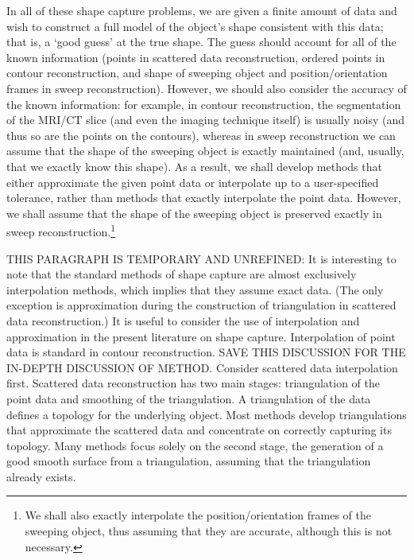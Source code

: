 In all of these shape capture problems,
we are given a finite amount of data and wish to 
construct a full model of the object's shape consistent with this data;
that is, a `good guess' at the true shape.
The guess should account for all of the known information (points in scattered
data reconstruction, ordered points in contour reconstruction, and
shape of sweeping object and position/orientation frames in sweep
reconstruction).
However, we should also consider the accuracy of the known information:
for example, in contour reconstruction, the segmentation of the MRI/CT 
slice (and even the imaging technique itself)
is usually noisy (and thus so are the points on the contours),
whereas in sweep reconstruction we can assume 
that the shape of the sweeping object is exactly maintained
(and, usually, that we exactly know this shape).
As a result, we shall develop methods that either approximate
the given point data or interpolate up to a user-specified tolerance,
rather than methods that exactly interpolate the point data.
However, we shall assume that the shape of the sweeping object
is preserved exactly in sweep reconstruction.\footnote{We shall also 
	exactly interpolate the position/orientation frames of the sweeping
	object, thus assuming that they are accurate, although this is not 
	necessary.}

THIS PARAGRAPH IS TEMPORARY AND UNREFINED:
It is interesting to note that the standard methods of shape capture
are almost exclusively interpolation methods, which implies that they assume
exact data.
(The only exception is approximation during the construction of triangulation
in scattered data reconstruction.)
It is useful to consider the use of interpolation and approximation
in the present literature on shape capture.
Interpolation of point data is standard in contour reconstruction.
SAVE THIS DISCUSSION FOR THE IN-DEPTH DISCUSSION OF METHOD.
Consider scattered data interpolation first.
Scattered data reconstruction has two main stages:
triangulation of the point data and smoothing of the triangulation.
A triangulation of the data defines a topology for the underlying object.
Most methods develop triangulations that approximate the scattered data
and concentrate on correctly capturing its topology.
Many methods focus solely on the second stage,
the generation of a good smooth surface from a triangulation, 
assuming that the triangulation already exists.


